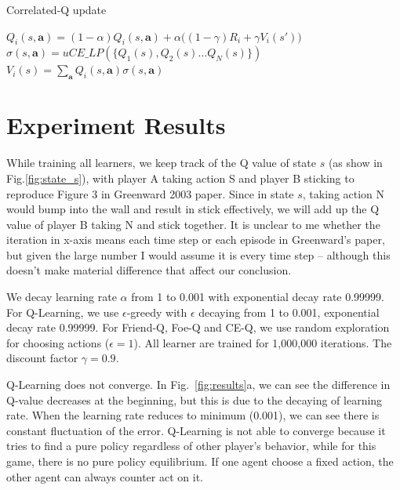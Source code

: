 \documentclass[conference]{IEEEtran}
\begin{document}
\begin{algorithm}[h!]
	\caption{Correlated-Q update}
	\begin{algorithmic}
			\State $Q_i(s, \mathbf{a}) = (1-\alpha) Q_i(s, \mathbf{a}) + \alpha  \big( (1-\gamma) R_i + \gamma V_i(s') \big)$
		\EndFor
		\State $\sigma(s, \mathbf{a}) = uCE\_LP(\{Q_1(s), Q_2(s)\dots Q_N(s)\})$ 
		\State $V_i(s) = \sum_{\mathbf{a}} Q_i(s, \mathbf{a}) \sigma(s, \mathbf{a})$
		\EndFor
		\EndFunction
	\end{algorithmic}
	\label{algo:ce-Q}
\end{algorithm}

\section{Experiment Results}
While training all learners, we keep track of the Q value of state $s$ (as show in Fig.\ref{fig:state_s}), with player A taking action S and player B sticking to reproduce Figure 3 in Greenward 2003 paper. Since in state $s$, taking action N would bump into the wall and result in stick effectively, we will add up the Q value of player B taking N and stick together. It is unclear to me whether the iteration in x-axis means each time step or each episode in Greenward's paper, but given the large number I would assume it is every time step -- although this doesn't make material difference that affect our conclusion. 

We decay learning rate $\alpha$ from 1 to 0.001 with exponential decay rate 0.99999. For Q-Learning, we use $\epsilon$-greedy with $\epsilon$ decaying from 1 to 0.001, exponential decay rate 0.99999. For Friend-Q, Foe-Q and CE-Q, we use random exploration for choosing actions ($\epsilon=1$). All learner are trained for 1,000,000 iterations. The discount factor $\gamma=0.9$.

Q-Learning does not converge. In Fig.~\ref{fig:results}a, we can see the difference in Q-value decreases at the beginning, but this is due to the decaying of learning rate. When the learning rate reduces to minimum (0.001), we can see there is constant fluctuation of the error. Q-Learning is not able to converge because it tries to find a pure policy regardless of other player's behavior, while for this game, there is no pure policy equilibrium. If one agent choose a fixed action, the other agent can always counter act on it.
\end{document}
